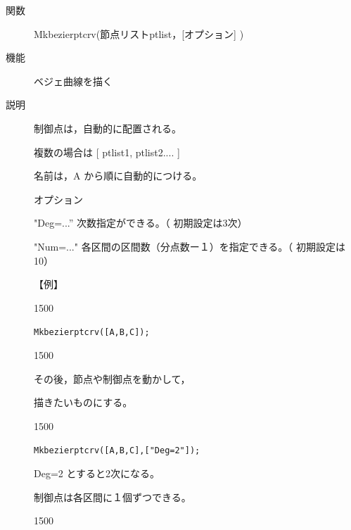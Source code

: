 \documentclass[papersize,a4paper,12pt,uplatex]{jsarticle}
\begin{document}
\begin{description}
\vspace{\baselineskip}
\hypertarget{mkbezierptcrv}{}
\item[関数]  Mkbezierptcrv(節点リストptlist，[オプション] )
\item[機能]  ベジェ曲線を描く
\item[説明]  制御点は，自動的に配置される。

複数の場合は  [ ptlist1, ptlist2.... ]

名前は，A から順に自動的につける。

オプション

"Deg=...”  次数指定ができる。（ 初期設定は3次）

"Num=..."  各区間の区間数（分点数ー１）を指定できる。（ 初期設定は10）

\vspace{5mm}

【例】

\begin{layer}{150}{0}
\end{layer}

\verb|Mkbezierptcrv([A,B,C]);|

\vspace{25mm}

\begin{layer}{150}{0}
\end{layer}

その後，節点や制御点を動かして，

描きたいものにする。

\vspace{30mm}

\begin{layer}{150}{0}
\end{layer}

\verb|Mkbezierptcrv([A,B,C],["Deg=2"]);|

Deg=2 とすると2次になる。

制御点は各区間に１個ずつできる。

\vspace{20mm}

\begin{layer}{150}{0}
\end{layer}


\end{description}
\end{document}
